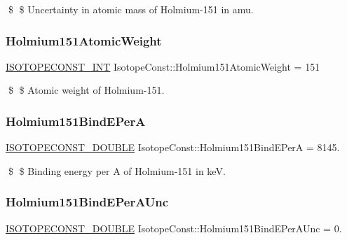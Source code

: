 \$ \$ Uncertainty in atomic mass of Holmium-\/151 in amu. \mbox{\label{group___isotope_const-_holmium-_ho151_gac1715119eaf83d862aec195ef7583d73}} 
\subsubsection{\texorpdfstring{Holmium151\+Atomic\+Weight}{Holmium151AtomicWeight}}
{\footnotesize\ttfamily \mbox{\hyperlink{group___isotope_const-_macros_ga5f18360b3e99483a35c32d789e62621c}{I\+S\+O\+T\+O\+P\+E\+C\+O\+N\+S\+T\+\_\+\+I\+NT}} Isotope\+Const\+::\+Holmium151\+Atomic\+Weight = 151}

\$ \$ Atomic weight of Holmium-\/151. \mbox{\label{group___isotope_const-_holmium-_ho151_ga6a38c03411320be9fc10e2713b82ac9d}} 
\subsubsection{\texorpdfstring{Holmium151\+Bind\+E\+PerA}{Holmium151BindEPerA}}
{\footnotesize\ttfamily \mbox{\hyperlink{group___isotope_const-_macros_ga8f45a7272ce02c0b4c65c44636ed719a}{I\+S\+O\+T\+O\+P\+E\+C\+O\+N\+S\+T\+\_\+\+D\+O\+U\+B\+LE}} Isotope\+Const\+::\+Holmium151\+Bind\+E\+PerA = 8145.}

\$ \$ Binding energy per A of Holmium-\/151 in keV. \mbox{\label{group___isotope_const-_holmium-_ho151_gaa70d691e34db97d01d48d569b401eab6}} 
\subsubsection{\texorpdfstring{Holmium151\+Bind\+E\+Per\+A\+Unc}{Holmium151BindEPerAUnc}}
{\footnotesize\ttfamily \mbox{\hyperlink{group___isotope_const-_macros_ga8f45a7272ce02c0b4c65c44636ed719a}{I\+S\+O\+T\+O\+P\+E\+C\+O\+N\+S\+T\+\_\+\+D\+O\+U\+B\+LE}} Isotope\+Const\+::\+Holmium151\+Bind\+E\+Per\+A\+Unc = 0.}

